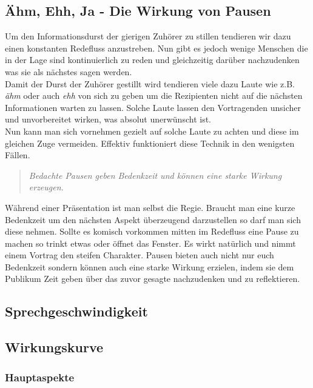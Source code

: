 \documentclass[../main.tex]{subfiles}
\begin{document}
        \subsection[Pausen]{Ähm, Ehh, Ja - Die Wirkung von Pausen}
            Um den Informationsdurst der gierigen Zuhörer zu stillen tendieren wir dazu einen konstanten Redefluss anzustreben. Nun gibt es jedoch wenige Menschen die in der Lage sind kontinuierlich zu reden und gleichzeitig darüber nachzudenken was sie als nächstes sagen werden.\\
            Damit der Durst der Zuhörer gestillt wird tendieren viele dazu Laute wie z.B. \emph{ähm} oder auch \emph{ehh} von sich zu geben um die Rezipienten nicht auf die nächsten Informationen warten zu lassen. Solche Laute lassen den Vortragenden unsicher und unvorbereitet wirken, was absolut unerwünscht ist.\\
            Nun kann man sich vornehmen gezielt auf solche Laute zu achten und diese im gleichen Zuge vermeiden. Effektiv funktioniert diese Technik in den wenigsten Fällen.
            \begin{quote}
                \emph{Bedachte Pausen geben Bedenkzeit und können eine starke Wirkung erzeugen.}
            \end{quote}
            Während einer Präsentation ist man selbst die Regie. Braucht man eine kurze Bedenkzeit um den nächsten Aspekt überzeugend darzustellen so darf man sich diese nehmen. Sollte es komisch vorkommen mitten im Redefluss eine Pause zu machen so trinkt etwas oder öffnet das Fenster. Es wirkt natürlich und nimmt einem Vortrag den steifen Charakter. Pausen bieten auch nicht nur euch Bedenkzeit sondern können auch eine starke Wirkung erzielen, indem sie dem Publikum Zeit geben über das zuvor gesagte nachzudenken und zu reflektieren.
            
        \subsection{Sprechgeschwindigkeit}
        
        \subsection{Wirkungskurve}\label{section:Seminar:RhetorikI:Wirkungskurve}
            \subsubsection{Hauptaspekte}
            
\end{document}
